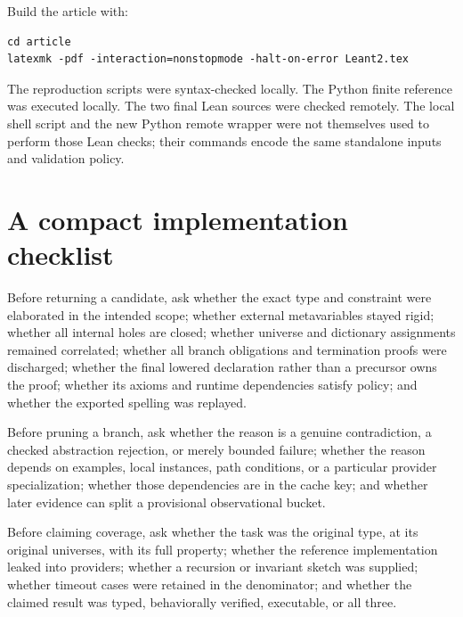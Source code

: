 Build the article with:
\begin{lstlisting}[language={}]
cd article
latexmk -pdf -interaction=nonstopmode -halt-on-error Leant2.tex
\end{lstlisting}
The reproduction scripts were syntax-checked locally. The Python finite reference was executed locally. The two final Lean sources were checked remotely. The local shell script and the new Python remote wrapper were not themselves used to perform those Lean checks; their commands encode the same standalone inputs and validation policy.

\section{A compact implementation checklist}

Before returning a candidate, ask whether the exact type and constraint were elaborated in the intended scope; whether external metavariables stayed rigid; whether all internal holes are closed; whether universe and dictionary assignments remained correlated; whether all branch obligations and termination proofs were discharged; whether the final lowered declaration rather than a precursor owns the proof; whether its axioms and runtime dependencies satisfy policy; and whether the exported spelling was replayed.

Before pruning a branch, ask whether the reason is a genuine contradiction, a checked abstraction rejection, or merely bounded failure; whether the reason depends on examples, local instances, path conditions, or a particular provider specialization; whether those dependencies are in the cache key; and whether later evidence can split a provisional observational bucket.

Before claiming coverage, ask whether the task was the original type, at its original universes, with its full property; whether the reference implementation leaked into providers; whether a recursion or invariant sketch was supplied; whether timeout cases were retained in the denominator; and whether the claimed result was typed, behaviorally verified, executable, or all three.
